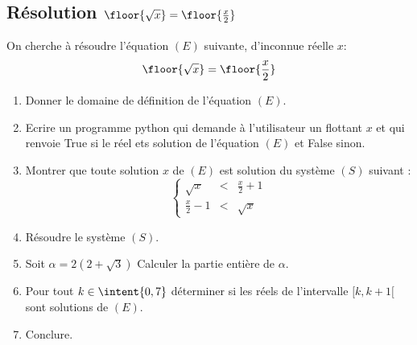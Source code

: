 \subsection{Résolution $\floor{\sqrt{x}} = \floor{ \frac{x}{2}}$}

\begin{exercice}
On cherche à résoudre l'équation $(E)$ suivante, d'inconnue réelle $x$: 
$$\floor{\sqrt{x}} = \floor{ \frac{x}{2}}$$
\begin{enumerate}
\item Donner le domaine de définition de  l'équation $(E)$. 
\item Ecrire un programme python qui demande à l'utilisateur un flottant $x$ et qui renvoie True si le réel ets solution de l'équation $(E)$  et False sinon. 
\item Montrer que toute solution $x$  de $(E)$ est solution du système $(S)$ suivant : 
$$\left\{ 
\begin{array}{ccc}
\sqrt{x}&<& \frac{x}{2}+1\\
\frac{x}{2}-1&<& \sqrt{x}
\end{array}
\right. $$
\item Résoudre le système $(S)$. 
\item Soit $\alpha = 2(2+\sqrt{3})$ Calculer la partie entière de $\alpha$. 
\item Pour tout $k\in \intent{0,7} $ déterminer si les réels de l'intervalle $[k,k+1[$ sont solutions de $(E)$. 
\item Conclure.  
\end{enumerate}
\end{exercice}
